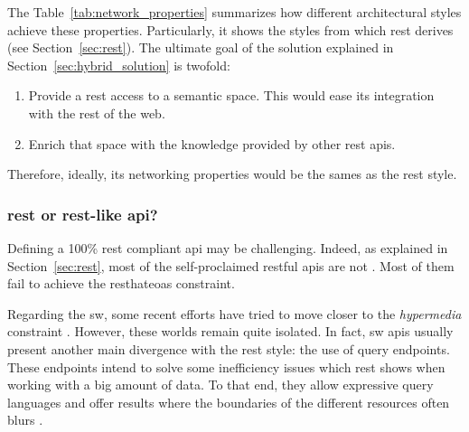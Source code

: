 
The Table~\ref{tab:network_properties} summarizes how different architectural styles achieve these properties.
Particularly, it shows the styles from which \ac{rest} derives (see Section~\ref{sec:rest}).
The ultimate goal of the solution explained in Section~\ref{sec:hybrid_solution} is twofold:
\begin{enumerate}
  \item Provide a \ac{rest} access to a semantic space.
       This would ease its integration with the rest of the web.
  \item Enrich that space with the knowledge provided by other \ac{rest} \acp{api}.
\end{enumerate}
Therefore, ideally, its networking properties would be the sames as the \ac{rest} style.






\subsubsection{\acs{rest} or \acs{rest}-like \ac{api}?}

Defining a 100\% \ac{rest} compliant \ac{api} may be challenging.
Indeed, as explained in Section~\ref{sec:rest}, most of the self-proclaimed \ac{rest}ful \acp{api} are not \citep{house_how_2012}.
Most of them fail to achieve the \ac{resthateoas} constraint.


Regarding the \ac{sw}, some recent efforts have tried to move closer to the \emph{hypermedia} constraint \citep{steiner_fulfilling_2011,kjernsmo_necessity_2012}.
However, these worlds remain quite isolated.
In fact, \ac{sw} \acp{api} usually present another main divergence with the \ac{rest} style: the use of query endpoints.
These endpoints intend to solve some inefficiency issues which \ac{rest} shows when working with a big amount of data. %
To that end, they allow expressive query languages and offer results where the boundaries of the different resources often blurs \citep{wilde_restful_2009}.

